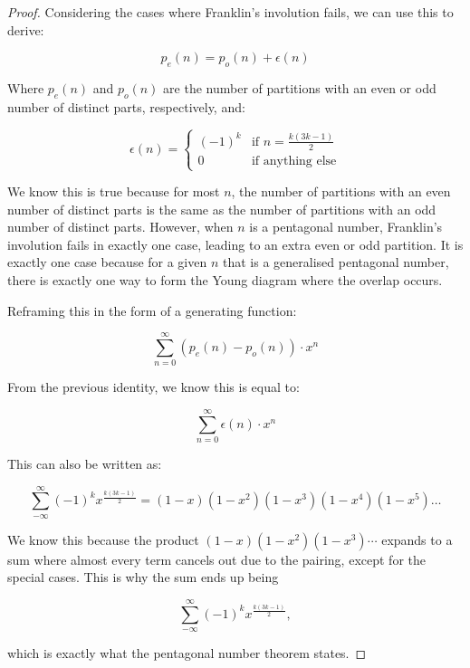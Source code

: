 \documentclass{article}
\theoremstyle{definition}
\begin{document}
\begin{proof}

Considering the cases where Franklin's involution fails, we can use this to derive:

\[
p_e(n) = p_o(n) + \epsilon(n)
\]

\noindent
Where $p_e(n)$ and $p_o(n)$ are the number of partitions with an even or odd number of distinct parts, respectively,
and:

\[
\epsilon(n) = 
    \begin{cases}
        (-1)^k & \text{if } n = \frac{k(3k-1)}{2} \\
        0 & \text{if anything else}
    \end{cases}
\]

\noindent
We know this is true because for most $n$, the number of partitions with an even number of distinct parts is the
same as the number of partitions with an odd number of distinct parts. However, when $n$ is a pentagonal number,
Franklin's involution fails in exactly one case, leading to an extra even or odd partition. It is exactly one case
because for a given $n$ that is a generalised pentagonal number, there is exactly one way to form the Young diagram
where the overlap occurs. \par

\vspace{10pt}

\noindent
Reframing this in the form of a generating function:

\[
\sum_{n=0}^{\infty} (p_e(n) - p_o(n)) \cdot x^n
\]

\noindent
From the previous identity, we know this is equal to:

\[
\sum_{n=0}^{\infty} \epsilon(n) \cdot x^n
\]

\noindent
This can also be written as:

\[
\sum_{-\infty}^{\infty} (-1)^k x^{\frac{k(3k-1)}{2}} = (1 - x)(1 - x^2)(1 - x^3)(1 - x^4)(1 - x^5)\dots
\]

\noindent
We know this because the product \((1-x)(1-x^2)(1-x^3)\cdots\) expands to a sum where almost every term cancels out
due to the pairing, except for the special cases. This is why the sum ends up being

\[
\sum_{-\infty}^{\infty} (-1)^k x^{\frac{k(3k-1)}{2}},
\]

\noindent
which is exactly what the pentagonal number theorem states.

\end{proof}
\end{document}
